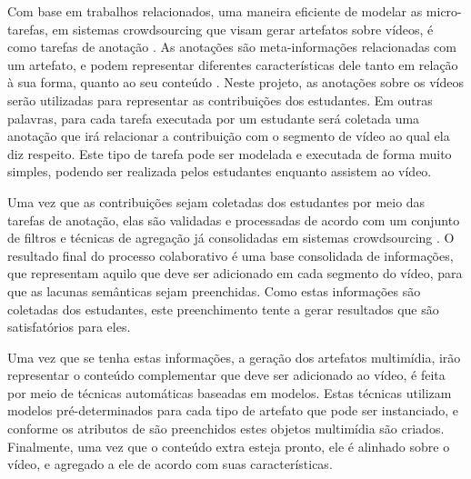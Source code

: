 Com base em trabalhos relacionados, uma maneira eficiente de modelar as micro-tarefas, em sistemas crowdsourcing que visam gerar artefatos sobre vídeos, é como tarefas de anotação \cite{ref:vidwiki2014,Wu:2011:VSV:1979742.1979803}. As anotações são meta-informações relacionadas com um artefato, e podem representar diferentes características dele tanto em relação à sua forma, quanto ao seu conteúdo \cite{Singhal:2014:GSA:2611040.2611056}. Neste projeto, as anotações sobre os vídeos serão utilizadas para representar as contribuições dos estudantes. Em outras palavras, para cada tarefa executada por um estudante será coletada uma anotação que irá relacionar a contribuição com o segmento de vídeo ao qual ela diz respeito. Este tipo de tarefa pode ser modelada e executada de forma muito simples, podendo ser realizada pelos estudantes enquanto assistem ao vídeo.

Uma vez que as contribuições sejam coletadas dos estudantes por meio das tarefas de anotação, elas são validadas e processadas de acordo com um conjunto de filtros e técnicas de agregação já consolidadas em sistemas crowdsourcing \cite{Alelyani:2016:SCR:2989238.2989245,Hipp:2013}. O resultado final do processo colaborativo é uma base consolidada de informações, que representam aquilo que deve ser adicionado em cada segmento do vídeo, para que as lacunas semânticas sejam preenchidas. Como estas informações são coletadas dos estudantes, este preenchimento tente a gerar resultados que são satisfatórios para eles.

Uma vez que se tenha estas informações, a geração dos artefatos multimídia, irão representar o conteúdo complementar que deve ser adicionado ao vídeo, é feita por meio de técnicas automáticas baseadas em modelos. Estas técnicas utilizam modelos pré-determinados para cada tipo de artefato que pode ser instanciado, e conforme os atributos de são preenchidos estes objetos multimídia são criados. Finalmente, uma vez que o conteúdo extra esteja pronto, ele é alinhado sobre o vídeo, e agregado a ele de acordo com suas características.
